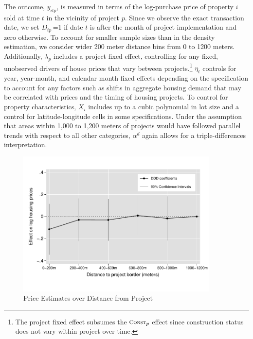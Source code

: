 \documentclass[12pt]{article}
\begin{document}
\noindent The outcome, $y_{itp}$, is measured in terms of the log-purchase price of property $i$ sold at time $t$ in the vicinity of project $p$.  Since we observe the exact transaction date, we set $D_{tp}$\,=1 if date $t$ is after the month of project implementation and zero otherwise.  To account for smaller sample sizes than in the density estimation, we consider wider 200 meter distance bins from 0 to 1200 meters.  Additionally, $\lambda_p$ includes a project fixed effect, controlling for any fixed, unobserved drivers of house prices that vary between projects.\footnote{The project fixed effect subsumes the $\textsc{\footnotesize Const}_{p}$ effect since construction status does not vary within project over time.}  $\eta_{t}$ controls for year, year-month, and calendar month fixed effects depending on the specification to account for any factors such as shifts in aggregate housing demand that may be correlated with prices and the timing of housing projects.  To control for property characteristics, $X_i$ includes up to a cubic polynomial in lot size and a control for latitude-longitude cells in some specifications.  Under the assumption that areas within 1,000 to 1,200 meters of projects would have followed parallel trends with respect to all other categories, $\alpha^d$ again allows for a triple-differences interpretation.  

\begin{figure}
\caption{Price Estimates over Distance from Project}\label{figure:distplot}
\centering
\includegraphics[width=0.9\textwidth,trim={0cm .7cm 0cm 0.7cm},clip=true]{figures/price_regs_DDDplot}
\vspace{-2mm}
\end{figure}
\end{document}
